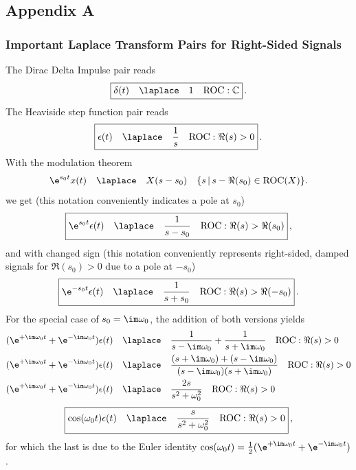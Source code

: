 \subsection*{Appendix A}

\subsubsection*{Important Laplace Transform Pairs for Right-Sided Signals}
The Dirac Delta Impulse pair reads
\begin{align}
\boxed{\delta(t) \quad \laplace \quad 1 \quad \text{ROC}: \mathbb{C}}\,.
\end{align}
The Heaviside step function pair reads
\begin{align}
\boxed{\epsilon(t) \quad \laplace \quad \frac{1}{s} \quad \text{ROC}: \Re(s)>0}\,.
\end{align}
With the modulation theorem
\begin{align}
\e^{s_0 t} x(t) \quad \laplace \quad X(s-s_0) \quad \{s \, | \, s-\Re(s_0) \in \text{ROC}(X)\}.
\end{align}
we get (this notation conveniently indicates a pole at $s_0$)
\begin{align}
\boxed{\e^{s_0 t} \epsilon(t)\quad \laplace \quad \frac{1}{s-s_0} \quad \text{ROC}: \Re(s)>\Re(s_0)}\,,
\end{align}
and with changed sign (this notation conveniently represents right-sided,
damped signals for $\Re(s_0)>0$ due to a pole at $-s_0$)
\begin{align}
\boxed{\e^{-s_0 t} \epsilon(t)\quad \laplace \quad \frac{1}{s+s_0} \quad \text{ROC}: \Re(s)>\Re(-s_0)}\,.
\end{align}
%
For the special case of $s_0 = \im \omega_0$, the addition of both versions
yields
\begin{align}
(\e^{+\im \omega_0 t} + \e^{-\im \omega_0 t})  \epsilon(t)\quad &\laplace \quad \frac{1}{s-\im \omega_0} + \frac{1}{s+\im \omega_0} \quad \text{ROC}: \Re(s)>0\\
(\e^{+\im \omega_0 t} + \e^{-\im \omega_0 t})  \epsilon(t)\quad &\laplace \quad \frac{(s+\im \omega_0) + (s-\im \omega_0)}{(s-\im \omega_0)(s+\im \omega_0)}\quad \text{ROC}: \Re(s)>0\\
(\e^{+\im \omega_0 t} + \e^{-\im \omega_0 t})  \epsilon(t)\quad &\laplace \quad \frac{2 s}{s^2 + \omega_0^2}\quad \text{ROC}: \Re(s)>0
\end{align}
\begin{align}
\boxed{\cos(\omega_0 t) \epsilon(t)\quad \laplace \quad \frac{s}{s^2 + \omega_0^2}\quad \text{ROC}: \Re(s)>0}\,,
\end{align}
for which the last is due to the Euler identity $\cos(\omega_0 t) = \frac{1}{2} (\e^{+\im \omega_0 t}+\e^{-\im \omega_0 t})$.
%

